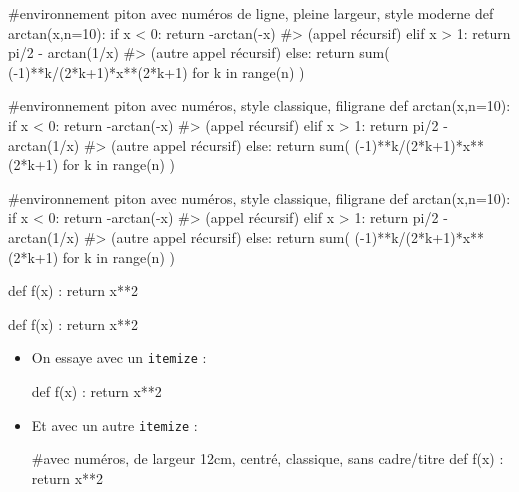 \documentclass[a4paper,french,11pt]{article}
\begin{document}
\begin{CodePiton}{}
#environnement piton avec numéros de ligne, pleine largeur, style moderne
def arctan(x,n=10):
	if x < 0:
		return -arctan(-x) #> (appel récursif)
	elif x > 1:
		return pi/2 - arctan(1/x) #> (autre appel récursif)
	else:
		return sum( (-1)**k/(2*k+1)*x**(2*k+1) for k in range(n) )
\end{CodePiton}

\begin{codetex}
\begin{CodePiton}[Style=Classique,Filigrane]{}
#environnement piton avec numéros, style classique, filigrane
def arctan(x,n=10):
	if x < 0:
		return -arctan(-x) #> (appel récursif)
	elif x > 1:
		return pi/2 - arctan(1/x) #> (autre appel récursif)
	else:
		return sum( (-1)**k/(2*k+1)*x**(2*k+1) for k in range(n) )
\end{CodePiton}
\end{codetex}

\begin{CodePiton}[Style=Classique,Filigrane]{}
#environnement piton avec numéros, style classique, filigrane
def arctan(x,n=10):
	if x < 0:
		return -arctan(-x) #> (appel récursif)
	elif x > 1:
		return pi/2 - arctan(1/x) #> (autre appel récursif)
	else:
		return sum( (-1)**k/(2*k+1)*x**(2*k+1) for k in range(n) )
\end{CodePiton}

\begin{codetex}
\begin{CodePiton}[Alignement=flush right,Largeur=13cm]{}
def f(x) :
	return x**2
\end{CodePiton}

\begin{CodePiton}[Alignement=flush left,Largeur=11cm]{}
def f(x) :
	return x**2
\end{CodePiton}

\begin{itemize} %
	\item On essaye avec un \texttt{itemize} :
	\begin{CodePiton}[Largeur=12cm,Style=Classique,Cadre=false]{}
		def f(x) :
			return x**2
	\end{CodePiton}
	\item Et avec un autre \texttt{itemize} :
	\begin{CodePiton}[Largeur=12cm,Style=Classique,Cadre=false,BarreTitre=false]{}
		#avec numéros, de largeur 12cm, centré, classique, sans cadre/titre
		def f(x) :
			return x**2
	\end{CodePiton}
\end{itemize}
\end{codetex}
\end{document}
